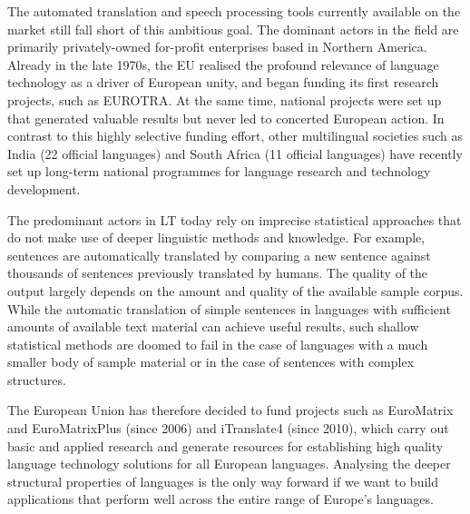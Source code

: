 \begin{multicols}{2}

The automated translation and speech processing tools currently available on the market still fall short of this ambitious goal. The dominant actors in the field are primarily privately-owned for-profit enterprises based in Northern America. Already in the late 1970s, the EU realised the profound relevance of language technology as a driver of European unity, and began funding its first research projects, such as EUROTRA. At the same time, national projects were set up that generated valuable results but never led to concerted European action. In contrast to this highly selective funding effort, other multilingual societies such as India (22 official languages) and South Africa (11 official languages) have recently set up long-term national programmes for language research and technology development.
 
The predominant actors in LT today rely on imprecise statistical approaches that do not make use of deeper linguistic methods and knowledge. For example, sentences are automatically translated by comparing a new sentence against thousands of sentences previously translated by humans. The quality of the output largely depends on the amount and quality of the available sample corpus. While the automatic translation of simple sentences in languages with sufficient amounts of available text material can achieve useful results, such shallow statistical methods are doomed to fail in the case of languages with a much smaller body of sample material or in the case of sentences with complex structures.

The European Union has therefore decided to fund projects such as EuroMatrix and EuroMatrixPlus (since 2006) and iTranslate4 (since 2010), which carry out basic and applied research and generate resources for establishing high quality language technology solutions for all European languages. Analysing the deeper structural properties of languages is the only way forward if we want to build applications that perform well across the entire range of Europe’s languages.


\end{multicols}
